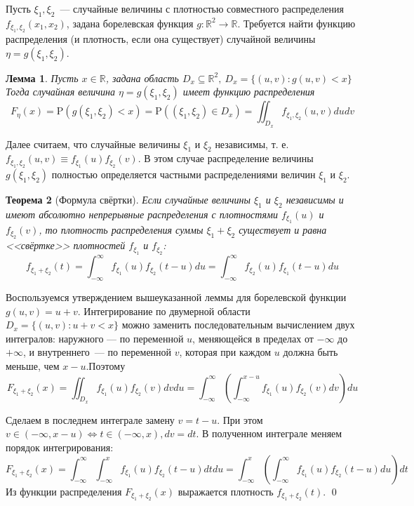 \documentclass[oneside,final,14pt]{extreport}
\renewenvironment{proof}{{\bfseries Доказательство.}}{\qed}
\newtheorem{thm}{Теорема}[section]
\newtheorem{lem}[thm]{Лемма}
\theoremstyle{definition}
\begin{document}
Пусть $\xi_1, \xi_2$~--- случайные величины с плотностью совместного распределения $f_{\xi_{1}, \xi_{2}}\left(x_{1}, x_{2}\right)$, задана борелевская функция $g: \mathbb{R}^{2} \rightarrow \mathbb{R}$. Требуется найти функцию распределения (и плотность, если она существует) случайной величины $\eta=g\left(\xi_{1}, \xi_{2}\right)$.
\begin{lem}
    Пусть $x \in \mathbb{R}$, задана область $D_{x} \subseteq \mathbb{R}^{2},~ D_x = \{ (u,v): g(u,v) < x\}$ Тогда случайная величина $\eta=g\left(\xi_{1}, \xi_{2}\right)$ имеет функцию распределения
    \begin{equation*}
        F_{\eta}(x)=\mathrm{P}\left(g\left(\xi_{1}, \xi_{2}\right)<x\right)=\mathrm{P}\left(\left(\xi_{1}, \xi_{2}\right) \in D_{x}\right)=\iint_{D_{x}} f_{\xi_{1}, \xi_{2}}(u, v) d u d v
    \end{equation*}
\end{lem}
Далее считаем, что случайные величины $\xi_1$ и $\xi_2$ независимы, т. е. $f_{\xi_{1}, \xi_{2}}(u, v) \equiv f_{\xi_{1}}(u) f_{\xi_{2}}(v)$. В этом случае распределение величины $g\left(\xi_{1}, \xi_{2}\right)$ полностью определяется частными распределениями величин $\xi_1$ и $\xi_2$.
\begin{thm}[Формула свёртки]
    Если случайные величины $\xi_1$ и $\xi_2$ независимы и имеют абсолютно непрерывные распределения с плотностями $f_{\xi_{1}}(u)$ и $f_{\xi_{2}}(v)$, то плотность распределения суммы $\xi_{1}+\xi_{2}$ существует и равна <<свёртке>> плотностей $f_{\xi_{1}}$ и $f_{\xi_{2}}$:
    \begin{equation*}
        f_{\xi_{1}+\xi_{2}}(t)=\int_{-\infty}^{\infty} f_{\xi_{1}}(u) f_{\xi_{2}}(t-u) d u=\int_{-\infty}^{\infty} f_{\xi_{2}}(u) f_{\xi_{1}}(t-u) d u
    \end{equation*}
\end{thm}
\begin{proof}
    Воспользуемся утверждением вышеуказанной леммы для борелевской функции $g(u, v)=u+v$. Интегрирование по двумерной области $D_{x}=\{(u, v) : u+v<x\}$ можно заменить последовательным вычислением двух интегралов: наружного — по переменной $u$, меняющейся в пределах от $-\infty$ до $+\infty$, и внутреннего~--- по переменной $v$, которая при каждом $u$ должна быть меньше, чем $x-u$.Поэтому
    \begin{equation*}
        F_{\xi_{1}+\xi_{2}}(x)=\iint_{D_{x}} f_{\xi_{1}}(u) f_{\xi_{2}}(v) d v d u=\int_{-\infty}^{\infty}\left(\int_{-\infty}^{x-u} f_{\xi_{1}}(u) f_{\xi_{2}}(v) d v\right) d u
    \end{equation*}
    
    Сделаем в последнем интеграле замену $v=t-u$. При этом $v \in(-\infty, x-u) \Leftrightarrow t \in(-\infty, x), d v=d t$. В полученном интеграле меняем порядок интегрирования:
    \begin{equation*}
        F_{\xi_{1}+\xi_{2}}(x)=\int_{-\infty}^{\infty} \int_{-\infty}^{x} f_{\xi_{1}}(u) f_{\xi_{2}}(t-u) d t d u=\int_{-\infty}^{x}\left(\int_{-\infty}^{\infty} f_{\xi_{1}}(u) f_{\xi_{2}}(t-u) d u\right) d t
    \end{equation*}
    Из функции распределения $F_{\xi_{1}+\xi_{2}}(x)$ выражается плотность $f_{\xi_{1}+\xi_{2}}(t)$.
\end{proof}
\end{document}
